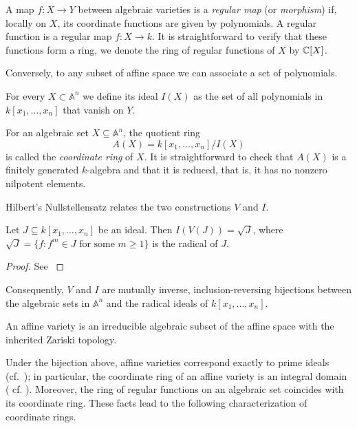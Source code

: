 A map $f : X \to Y$ between algebraic varieties is a \emph{regular map} (or \emph{morphism}) if, locally on $X$, its coordinate functions are given by polynomials. A regular function is a regular map $f: X \to k$. It is straightforward to verify that these functions form a ring, we denote the ring of regular functions of $X$ by $\mathbb{C}[X]$.

Conversely, to any subset of affine space we can associate a set of polynomials.
\begin{definition}
	For every $X \subset \mathbb{A}^n$ we define its ideal $I(X)$ as the set of all polynomials in $k[x_1, \dots, x_n]$ that vanish on $Y$.
\end{definition}

For an algebraic set $X \subseteq \mathbb{A}^n$, the quotient ring
\[
    A(X) = k[x_1, \dots, x_n] / I(X)
\]
is called the \emph{coordinate ring} of $X$. It is straightforward to check that $A(X)$ is a finitely generated $k$-algebra and that it is reduced, that is, it has no nonzero nilpotent elements.

Hilbert's Nullstellensatz relates the two constructions $V$ and $I$.

\begin{theorem}\label{thm:nullstellensatz}
    Let $J \subseteq k[x_1, \dots, x_n]$ be an ideal. Then $I(V(J)) = \sqrt{J}$, where $\sqrt{J} = \{ f : f^m \in J \text{ for some } m \geq 1 \}$ is the radical of $J$.
\end{theorem}


\begin{proof}
	See \cite[Chap. VII, thm 14]{zariskiCommutativeAlgebra1986}
\end{proof}

Consequently, $V$ and $I$ are mutually inverse, inclusion-reversing bijections between the algebraic sets in $\mathbb{A}^n$ and the radical ideals of $k[x_1, \dots, x_n]$.

\begin{definition}
	An affine variety is an irreducible algebraic subset of the affine space with the inherited Zariski topology.
\end{definition}

Under the bijection above, affine varieties correspond exactly to prime ideals (cf.\ \cite[Prop.~11.2.3]{tauvelLieAlgebrasAlgebraic2005}); in particular, the coordinate ring of an affine variety is an integral domain ( cf. \cite[Prop.~1.2.6]{blandRingsTheirModules2011}). Moreover, the ring of regular functions on an algebraic set coincides with its coordinate ring. These facts lead to the following characterization of coordinate rings.

